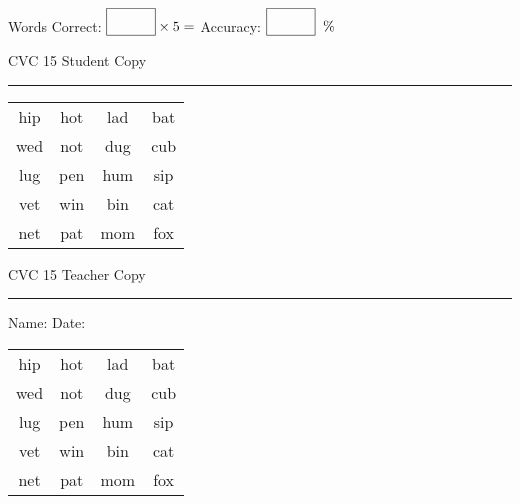 \documentclass{memoir}
\begin{document}
\normalsize

Words Correct: $\fbox{\phantom{\huge 100}} \times 5 = $ Accuracy: $\fbox{\phantom{\huge 100}}\;\; \%$ 

\vfill

\newpage


\footnotesize \noindent
CVC 15 \hfill Student Copy
\smallskip
\hrule

\huge

\setlength{\tabcolsep}{14pt}
\def\arraystretch{2}

{\selectfont


\begin{vplace}[0.5]
\begin{center}
\begin{tabular}{cccc}
hip & hot & lad & bat \\
wed & not & dug & cub \\
lug & pen & hum & sip \\
vet & win & bin & cat \\
net & pat & mom & fox \\
\end{tabular}
\end{center}
\end{vplace}

}

\newpage

\footnotesize \noindent
CVC 15 \hfill Teacher Copy
\smallskip
\hrule

\normalsize

\vfill

\noindent
Name: \underline{\hspace{1.75in}} \hfill Date: \underline{\hspace{1in}}

\huge

{\selectfont


\begin{vplace}[0.5]
\begin{center}
\begin{tabular}{cccc}
hip & hot & lad & bat \\
wed & not & dug & cub \\
lug & pen & hum & sip \\
vet & win & bin & cat \\
net & pat & mom & fox \\
\end{tabular}
\end{center}
\end{vplace}



}
\end{document}
